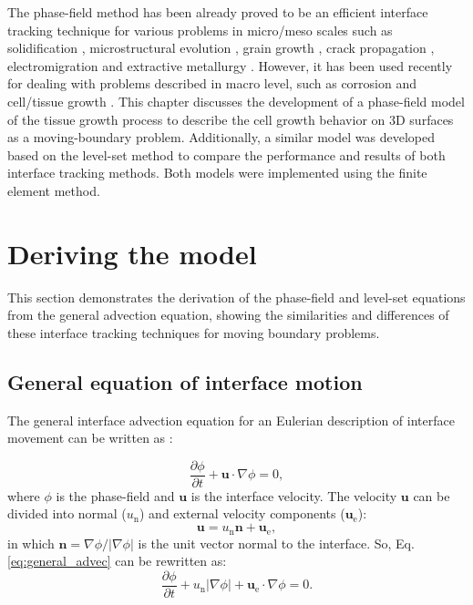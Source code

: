 The phase-field method has been already proved to be an efficient interface tracking technique for various problems in micro/meso scales such as solidification \cite{Karma1998,Boettinger2002}, microstructural evolution \cite{Chen2002}, grain growth \cite{Chen1994}, crack propagation \cite{Henry2004,Spatschek2011}, electromigration \cite{Bhate2000} and extractive metallurgy \cite{Bellemans2017}. However, it has been used recently for dealing with problems described in macro level, such as corrosion \cite{Mai2016,Lin2019,Imanian2018,Lin2020,Ansari2018,Tsuyuki2018,Chadwick2018} and cell/tissue growth \cite{Jeong2017,Lee2019}. This chapter discusses the development of a phase-field model of the tissue growth process to describe the cell growth behavior on 3D surfaces as a moving-boundary problem. Additionally, a similar model was developed based on the level-set method to compare the performance and results of both interface tracking methods. Both models were implemented using the finite element method.


\section{Deriving the model}

This section demonstrates the derivation of the phase-field and level-set equations from the general advection equation, showing the similarities and differences of these interface tracking techniques for moving boundary problems.

\subsection{General equation of interface motion}

The general interface advection equation for an Eulerian description of interface movement can be written as \cite{Sun2007}:

\begin{equation} \label{eq:general_advec}
\frac{\partial \phi}{\partial t}+\boldsymbol{u} \cdot \nabla \phi=0,
\end{equation}
where $\phi$ is the phase-field and $\boldsymbol{u}$ is the interface velocity. The velocity $\boldsymbol{u}$ can be divided into normal ($u_{\mathrm{n}}$) and external velocity components ($\boldsymbol{u}_{\mathrm{e}}$):
\begin{equation} \label{eq:two_comp_advect}
\boldsymbol{u}=u_{\mathrm{n}} \boldsymbol{n}+\boldsymbol{u}_{\mathrm{e}},
\end{equation}
in which $\boldsymbol{n}=\nabla \phi /|\nabla \phi|$ is the unit vector normal to the interface. So, Eq. \ref{eq:general_advec} can be rewritten as:
\begin{equation}
\frac{\partial \phi}{\partial t}+u_{\mathrm{n}}|\nabla \phi|+\boldsymbol{u}_{\mathrm{e}} \cdot \nabla \phi=0.
\end{equation}

